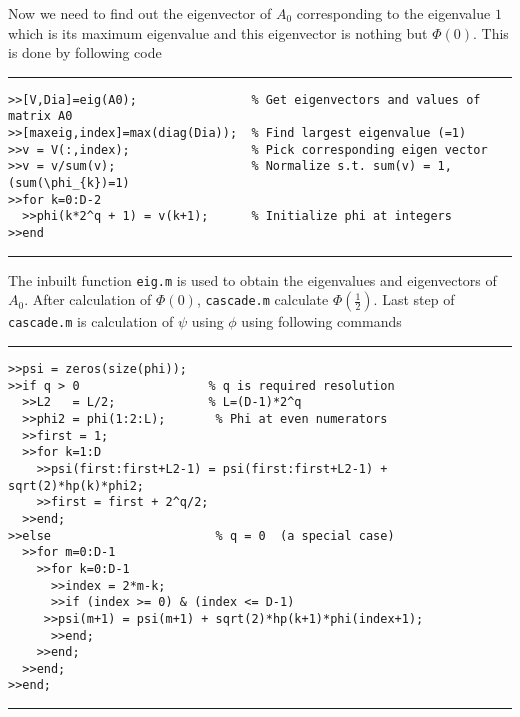 \documentclass[acmtoms]{acmtrans2m}
\begin{document}
Now we need to find out the eigenvector of $A_0$ corresponding to the eigenvalue
$1$ which is its maximum eigenvalue and this eigenvector is nothing but $\Phi(0)$. This is done by following code
\\\hrule
\begin{verbatim}
>>[V,Dia]=eig(A0);                % Get eigenvectors and values of matrix A0
>>[maxeig,index]=max(diag(Dia));  % Find largest eigenvalue (=1)
>>v = V(:,index);                 % Pick corresponding eigen vector
>>v = v/sum(v);                   % Normalize s.t. sum(v) = 1, (sum(\phi_{k})=1)
>>for k=0:D-2
  >>phi(k*2^q + 1) = v(k+1);      % Initialize phi at integers
>>end
\end{verbatim}
\hrule \vspace{.5cm}
The inbuilt function \verb#eig.m# is used to obtain the eigenvalues and eigenvectors of $A_0$. After calculation of $\Phi(0)$, {\tt cascade.m} calculate $\Phi\left(\frac{1}{2}\right)$. Last step of {\tt cascade.m} is calculation of $\psi$ using $\phi$ using following commands
\\\hrule
\begin{verbatim}
>>psi = zeros(size(phi));
>>if q > 0                  % q is required resolution
  >>L2   = L/2;             % L=(D-1)*2^q
  >>phi2 = phi(1:2:L);       % Phi at even numerators
  >>first = 1;
  >>for k=1:D
    >>psi(first:first+L2-1) = psi(first:first+L2-1) + sqrt(2)*hp(k)*phi2;
    >>first = first + 2^q/2;
  >>end;
>>else                       % q = 0  (a special case)
  >>for m=0:D-1
    >>for k=0:D-1
      >>index = 2*m-k;
      >>if (index >= 0) & (index <= D-1)
     >>psi(m+1) = psi(m+1) + sqrt(2)*hp(k+1)*phi(index+1);
      >>end;
    >>end;
  >>end;
>>end;
\end{verbatim}
\hrule
\vspace{.5cm}


\end{document}
